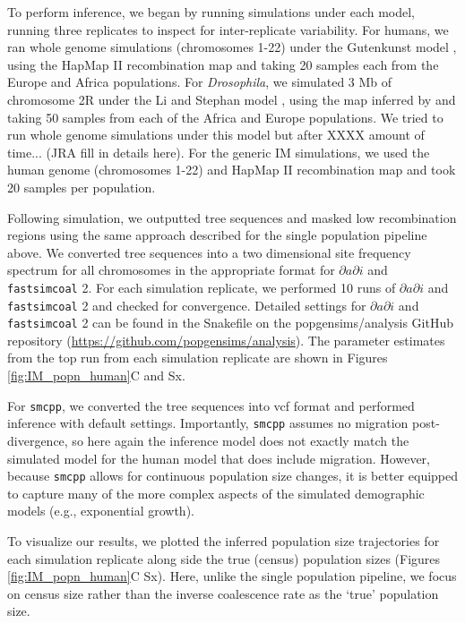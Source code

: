 \documentclass[12pt,halfline,a4paper]{ouparticle}
\newcommand{\dadi}{$\partial a \partial i$\xspace}
\newcommand{\smcpp}{\texttt{smcpp}\xspace}
\newcommand{\fastsimcoal}{\texttt{fastsimcoal}\xspace}
\begin{document}
To perform inference, we began by running simulations under each model, running
three replicates to inspect for inter-replicate variability. For humans, we ran
whole genome simulations (chromosomes 1-22) under the Gutenkunst model \citep{gutenkunst2009inferring},
using the HapMap II recombination map \citep{international2007second} and taking 20
samples each from the Europe and Africa populations. For \emph{Drosophila},
we simulated 3 Mb of chromosome 2R under the Li and Stephan model \citep{li2006inferring},
using the map inferred by \cite{comeron2012many} and taking 50 samples from each of
the Africa and Europe populations. We tried to run whole genome simulations under
this model but after XXXX amount of time... (JRA fill in details here). For the generic
IM simulations, we used the human genome (chromosomes 1-22) and HapMap II recombination
map \citep{international2007second} and took 20 samples per population.

Following simulation, we outputted tree sequences and masked low recombination
regions using the same approach described for the single population pipeline above. We
converted tree sequences into a two dimensional site frequency spectrum for all
chromosomes in the appropriate format for \dadi and \fastsimcoal2. For each simulation
replicate, we performed 10 runs of \dadi and \fastsimcoal2 and checked for convergence.
Detailed settings for \dadi and \fastsimcoal2 can be found in the Snakefile
on the popgensims/analysis GitHub repository (\url{https://github.com/popgensims/analysis}).
The parameter estimates from the top run from each simulation replicate
are shown in Figures \ref{fig:IM_popn_human}C and Sx.

For \smcpp , we converted the tree sequences into vcf format and performed inference
with default settings. Importantly, \smcpp assumes no migration post-divergence, so
here again the inference model does not exactly match the simulated model for the
human model that does include migration. However, because \smcpp allows
for continuous population size changes, it is better equipped to capture many of the
more complex aspects of the simulated demographic models (e.g., exponential growth).

To visualize our results, we plotted the inferred population size trajectories
for each simulation replicate along side the true (census) population sizes
(Figures \ref{fig:IM_popn_human}C Sx). Here, unlike the single population pipeline,
we focus on census size rather than the inverse coalescence rate as the `true' population size.
\end{document}

